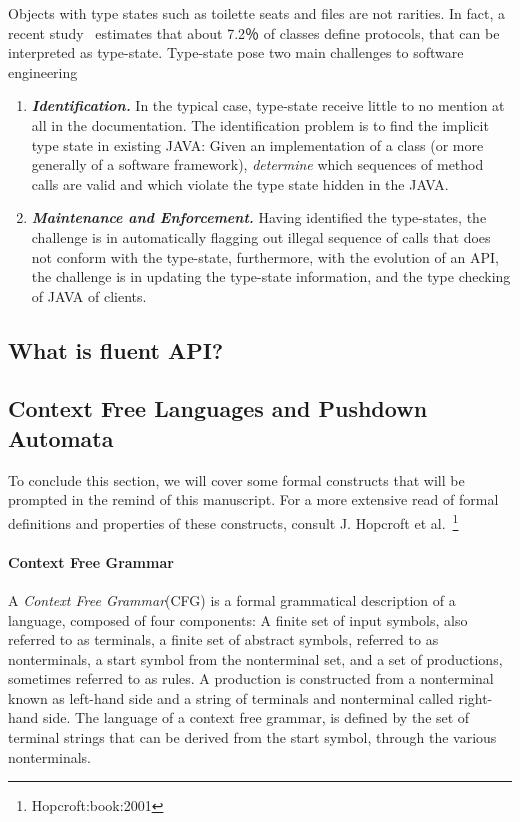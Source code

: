 Objects with type states such as toilette seats and files are not rarities.
In fact, a recent study~\cite{Beckman:2011} estimates
  that about 7.2％ of \Java classes define protocols, that can be interpreted as type-state.
Type-state pose two main challenges to software engineering
\begin{enumerate}
  \item \emph{\textbf{Identification.}}
    In the typical case, type-state
        receive little to no mention at all in the documentation.
    The identification problem is to find the implicit
    type state in existing JAVA: Given an implementation of a class
    (or more generally of a software framework),
    \emph{determine} which sequences of method calls are valid and which violate the
    type state hidden in the JAVA.
  \item \emph{\textbf{Maintenance and Enforcement.}}
    Having identified the type-states, the challenge is in automatically flagging out
      illegal sequence of calls that does not conform
      with the type-state, furthermore, with the
      evolution of an API, the challenge is in updating the type-state information,
      and the type checking of JAVA of clients.
\end{enumerate}

\subsection{What is fluent API?}

\subsection{Context Free Languages and Pushdown Automata}
To conclude this section, we will cover some formal
  constructs that will be prompted in the remind of this manuscript.
  For a more extensive read of formal definitions and properties
  of these constructs, consult J. Hopcroft et al.~\footnote{Hopcroft:book:2001}
  
\paragraph{Context Free Grammar}
A \emph{Context Free Grammar}(CFG) is a formal grammatical description of a language,
  composed of four components: A finite set of input symbols, also referred to as terminals,
  a finite set of abstract symbols, referred to as nonterminals, a start symbol from the 
  nonterminal set, and a set of productions, sometimes referred to as rules. 
A production is constructed from a nonterminal known as left-hand side and a 
  string of terminals and nonterminal called right-hand side.
The language of a context free grammar, is defined by the set of terminal strings 
  that can be derived from the start symbol, through the various nonterminals.
